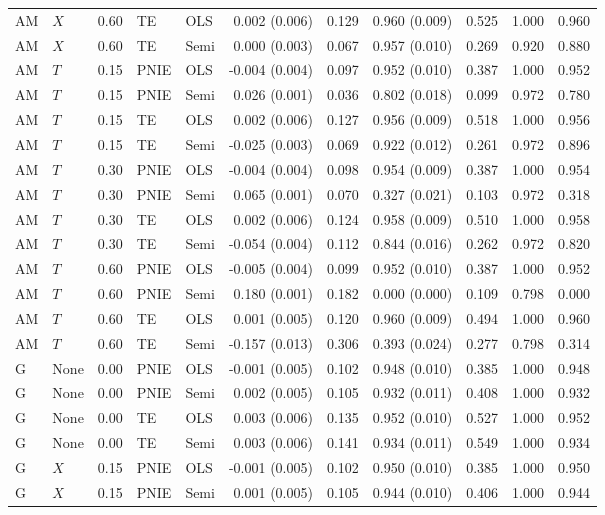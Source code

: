 \begin{longtable}{llrllrrrrrr}
AM & $X$ & 0.60 & TE & OLS & 0.002 (0.006) & 0.129 & 0.960 (0.009) & 0.525 & 1.000 & 0.960\\
AM & $X$ & 0.60 & TE & Semi & 0.000 (0.003) & 0.067 & 0.957 (0.010) & 0.269 & 0.920 & 0.880\\
AM & $T$ & 0.15 & PNIE & OLS & -0.004 (0.004) & 0.097 & 0.952 (0.010) & 0.387 & 1.000 & 0.952\\
AM & $T$ & 0.15 & PNIE & Semi & 0.026 (0.001) & 0.036 & 0.802 (0.018) & 0.099 & 0.972 & 0.780\\
AM & $T$ & 0.15 & TE & OLS & 0.002 (0.006) & 0.127 & 0.956 (0.009) & 0.518 & 1.000 & 0.956\\
AM & $T$ & 0.15 & TE & Semi & -0.025 (0.003) & 0.069 & 0.922 (0.012) & 0.261 & 0.972 & 0.896\\
AM & $T$ & 0.30 & PNIE & OLS & -0.004 (0.004) & 0.098 & 0.954 (0.009) & 0.387 & 1.000 & 0.954\\
AM & $T$ & 0.30 & PNIE & Semi & 0.065 (0.001) & 0.070 & 0.327 (0.021) & 0.103 & 0.972 & 0.318\\
AM & $T$ & 0.30 & TE & OLS & 0.002 (0.006) & 0.124 & 0.958 (0.009) & 0.510 & 1.000 & 0.958\\
AM & $T$ & 0.30 & TE & Semi & -0.054 (0.004) & 0.112 & 0.844 (0.016) & 0.262 & 0.972 & 0.820\\
AM & $T$ & 0.60 & PNIE & OLS & -0.005 (0.004) & 0.099 & 0.952 (0.010) & 0.387 & 1.000 & 0.952\\
AM & $T$ & 0.60 & PNIE & Semi & 0.180 (0.001) & 0.182 & 0.000 (0.000) & 0.109 & 0.798 & 0.000\\
AM & $T$ & 0.60 & TE & OLS & 0.001 (0.005) & 0.120 & 0.960 (0.009) & 0.494 & 1.000 & 0.960\\
AM & $T$ & 0.60 & TE & Semi & -0.157 (0.013) & 0.306 & 0.393 (0.024) & 0.277 & 0.798 & 0.314\\
\midrule
G & None & 0.00 & PNIE & OLS & -0.001 (0.005) & 0.102 & 0.948 (0.010) & 0.385 & 1.000 & 0.948\\
G & None & 0.00 & PNIE & Semi & 0.002 (0.005) & 0.105 & 0.932 (0.011) & 0.408 & 1.000 & 0.932\\
G & None & 0.00 & TE & OLS & 0.003 (0.006) & 0.135 & 0.952 (0.010) & 0.527 & 1.000 & 0.952\\
G & None & 0.00 & TE & Semi & 0.003 (0.006) & 0.141 & 0.934 (0.011) & 0.549 & 1.000 & 0.934\\
G & $X$ & 0.15 & PNIE & OLS & -0.001 (0.005) & 0.102 & 0.950 (0.010) & 0.385 & 1.000 & 0.950\\
G & $X$ & 0.15 & PNIE & Semi & 0.001 (0.005) & 0.105 & 0.944 (0.010) & 0.406 & 1.000 & 0.944\\

\end{longtable}
